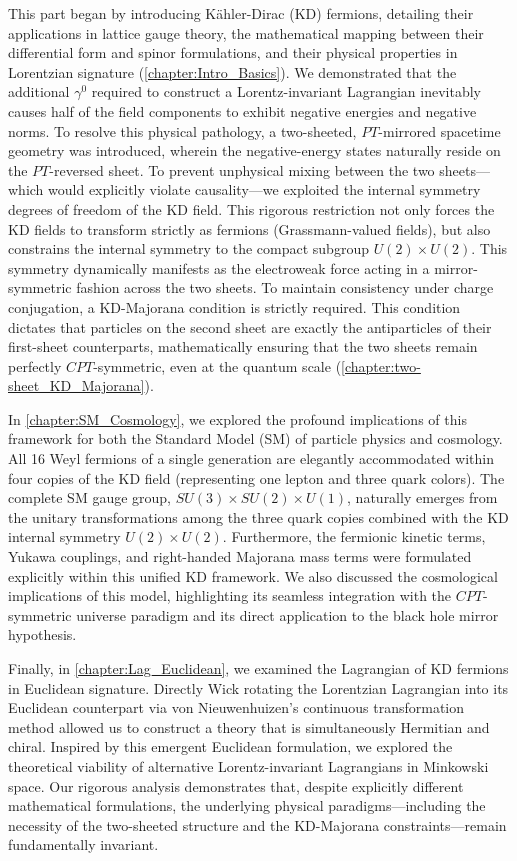 This part began by introducing Kähler-Dirac (KD) fermions, detailing their applications in lattice gauge theory, the mathematical mapping between their differential form and spinor formulations, and their physical properties in Lorentzian signature (\cref{chapter:Intro_Basics}). We demonstrated that the additional $\gamma^0$ required to construct a Lorentz-invariant Lagrangian inevitably causes half of the field components to exhibit negative energies and negative norms. To resolve this physical pathology, a two-sheeted, $PT$-mirrored spacetime geometry was introduced, wherein the negative-energy states naturally reside on the $PT$-reversed sheet. To prevent unphysical mixing between the two sheets—which would explicitly violate causality—we exploited the internal symmetry degrees of freedom of the KD field. This rigorous restriction not only forces the KD fields to transform strictly as fermions (Grassmann-valued fields), but also constrains the internal symmetry to the compact subgroup $U(2)\times U(2)$. This symmetry dynamically manifests as the electroweak force acting in a mirror-symmetric fashion across the two sheets. To maintain consistency under charge conjugation, a KD-Majorana condition is strictly required. This condition dictates that particles on the second sheet are exactly the antiparticles of their first-sheet counterparts, mathematically ensuring that the two sheets remain perfectly $CPT$-symmetric, even at the quantum scale (\cref{chapter:two-sheet_KD_Majorana}).

In \cref{chapter:SM_Cosmology}, we explored the profound implications of this framework for both the Standard Model (SM) of particle physics and cosmology. All 16 Weyl fermions of a single generation are elegantly accommodated within four copies of the KD field (representing one lepton and three quark colors). The complete SM gauge group, $SU(3)\times SU(2)\times U(1)$, naturally emerges from the unitary transformations among the three quark copies combined with the KD internal symmetry $U(2)\times U(2)$. Furthermore, the fermionic kinetic terms, Yukawa couplings, and right-handed Majorana mass terms were formulated explicitly within this unified KD framework. We also discussed the cosmological implications of this model, highlighting its seamless integration with the $CPT$-symmetric universe paradigm and its direct application to the black hole mirror hypothesis.

Finally, in \cref{chapter:Lag_Euclidean}, we examined the Lagrangian of KD fermions in Euclidean signature. Directly Wick rotating the Lorentzian Lagrangian into its Euclidean counterpart via von Nieuwenhuizen's continuous transformation method allowed us to construct a theory that is simultaneously Hermitian and chiral. Inspired by this emergent Euclidean formulation, we explored the theoretical viability of alternative Lorentz-invariant Lagrangians in Minkowski space. Our rigorous analysis demonstrates that, despite explicitly different mathematical formulations, the underlying physical paradigms—including the necessity of the two-sheeted structure and the KD-Majorana constraints—remain fundamentally invariant.

